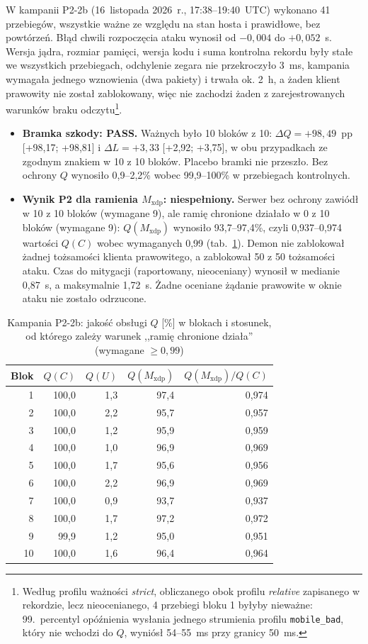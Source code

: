 \documentclass[a4paper,12pt]{article}
\begin{document}
W kampanii P2-2b (16~listopada 2026~r., 17:38--19:40~UTC) wykonano 41 przebiegów, wszystkie ważne ze względu na stan hosta i prawidłowe, bez powtórzeń. Błąd chwili rozpoczęcia ataku wynosił od $-0{,}004$ do $+0{,}052$~s. Wersja jądra, rozmiar pamięci, wersja kodu i suma kontrolna rekordu były stałe we wszystkich przebiegach, odchylenie zegara nie przekroczyło 3~ms, kampania wymagała jednego wznowienia (dwa pakiety) i trwała ok. 2~h, a żaden klient prawowity nie został zablokowany, więc nie zachodzi żaden z zarejestrowanych warunków braku odczytu\footnote{\raggedright Według profilu ważności \textit{strict}, obliczanego obok profilu \textit{relative} zapisanego w rekordzie, lecz nieocenianego, 4 przebiegi bloku 1 byłyby nieważne: 99.~percentyl opóźnienia wysłania jednego strumienia profilu \texttt{mobile\_bad}, który nie wchodzi do $Q$, wyniósł 54--55~ms przy granicy 50~ms.}.
\begin{itemize}
    \item \textbf{Bramka szkody: PASS.} Ważnych było 10 bloków z 10: $\Delta Q = +98{,}49$~pp [+98,17; +98,81] i $\Delta L = +3{,}33$ [+2,92; +3,75], w obu przypadkach ze zgodnym znakiem w 10 z 10 bloków. Placebo bramki nie przeszło. Bez ochrony $Q$ wynosiło 0,9--2,2\% wobec 99,9--100\% w przebiegach kontrolnych.
    \item \textbf{Wynik P2 dla ramienia $M_{\mathrm{xdp}}$: niespełniony.} Serwer bez ochrony zawiódł w 10 z 10 bloków (wymagane 9), ale ramię chronione działało w 0 z 10 bloków (wymagane 9): $Q(M_{\mathrm{xdp}})$ wynosiło 93,7--97,4\%, czyli 0,937--0,974 wartości $Q(C)$ wobec wymaganych 0,99 (tab.~\ref{tab:p2_bloki}). Demon nie zablokował żadnej tożsamości klienta prawowitego, a zablokował 50 z 50 tożsamości ataku. Czas do mitygacji (raportowany, nieoceniany) wynosił w medianie 0,87~s, a maksymalnie 1,72~s. Żadne oceniane żądanie prawowite w oknie ataku nie zostało odrzucone.
\end{itemize}

\begin{table}[H]
\centering
\small
\caption{Kampania P2-2b: jakość obsługi $Q$ [\%] w blokach i stosunek, od którego zależy warunek ,,ramię chronione działa'' (wymagane $\geq 0{,}99$)}\label{tab:p2_bloki}
\begin{tabular}{@{}rrrrr@{}}
\toprule
Blok & $Q(C)$ & $Q(U)$ & $Q(M_{\mathrm{xdp}})$ & $Q(M_{\mathrm{xdp}})/Q(C)$ \\
\midrule
1 & 100,0 & 1,3 & 97,4 & 0,974 \\
2 & 100,0 & 2,2 & 95,7 & 0,957 \\
3 & 100,0 & 1,2 & 95,9 & 0,959 \\
4 & 100,0 & 1,0 & 96,9 & 0,969 \\
5 & 100,0 & 1,7 & 95,6 & 0,956 \\
6 & 100,0 & 2,2 & 96,9 & 0,969 \\
7 & 100,0 & 0,9 & 93,7 & 0,937 \\
8 & 100,0 & 1,7 & 97,2 & 0,972 \\
9 & 99,9 & 1,2 & 95,0 & 0,951 \\
10 & 100,0 & 1,6 & 96,4 & 0,964 \\
\bottomrule
\end{tabular}
\end{table}
\end{document}
